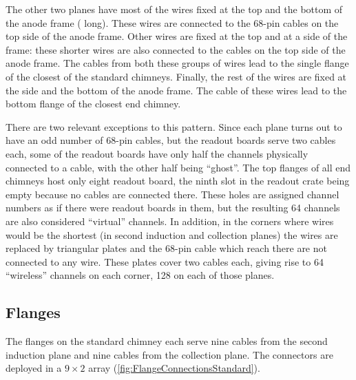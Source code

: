 The other two planes have most of the wires fixed at the top and the bottom of the anode frame
( long).
These wires are connected to the 68-pin cables on the top side of the anode frame.
Other wires are fixed at the top and at a side of the frame:
these shorter wires are also connected to the cables on the top side of the anode frame.
The cables from both these groups of wires lead to the single flange of the closest of the standard chimneys.
Finally, the rest of the wires are fixed at the side and the bottom of the anode frame.
The cable of these wires lead to the bottom flange of the closest end chimney.

There are two relevant exceptions to this pattern.
Since each plane turns out to have an odd number of 68-pin cables,
but the readout boards serve two cables each,
some of the readout boards have only half the channels physically connected to a cable,
with the other half being ``ghost''.
The top flanges of all end chimneys host only eight readout board,
the ninth slot in the readout crate being empty
because no cables are connected there.
These holes are assigned channel numbers as if there were readout boards in them,
but the resulting 64 channels are also considered ``virtual'' channels.
In addition, in the corners where wires would be the shortest
(in second induction and collection planes) the wires are replaced by triangular
plates and the 68-pin cable which reach there are not connected to any wire.
These plates cover two cables each, giving rise to 64 ``wireless'' channels on
each corner, 128 on each of those planes.


\subsection{Flanges}

The flanges on the standard chimney each serve nine cables from the second induction plane
and nine cables from the collection plane.
The connectors are deployed in a $9 \times 2$ array (\cref{fig:FlangeConnectionsStandard}).

